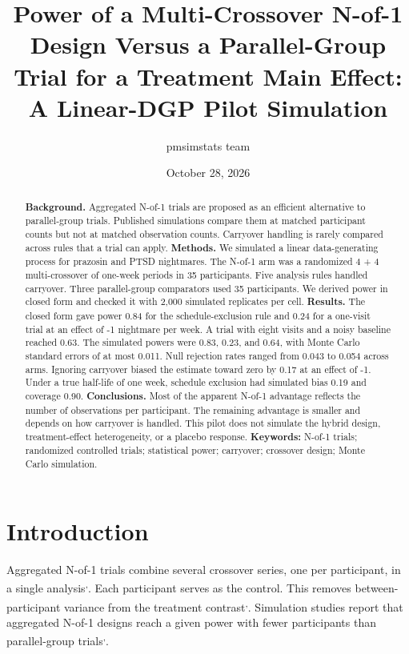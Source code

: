 \documentclass[
  11pt,
]{article}
\title{Power of a Multi-Crossover N-of-1 Design Versus a Parallel-Group Trial for a Treatment Main Effect: A Linear-DGP Pilot Simulation}
\author{pmsimstats team}
\date{October 28, 2026}
\begin{document}
\maketitle
\begin{abstract}
\textbf{Background.} Aggregated N-of-1 trials are proposed as an efficient alternative to parallel-group trials. Published simulations compare them at matched participant counts but not at matched observation counts. Carryover handling is rarely compared across rules that a trial can apply.
\textbf{Methods.} We simulated a linear data-generating process for prazosin and PTSD nightmares. The N-of-1 arm was a randomized 4 + 4 multi-crossover of one-week periods in 35 participants. Five analysis rules handled carryover. Three parallel-group comparators used 35 participants. We derived power in closed form and checked it with 2,000 simulated replicates per cell.
\textbf{Results.} The closed form gave power 0.84 for the schedule-exclusion rule and 0.24 for a one-visit trial at an effect of -1 nightmare per week. A trial with eight visits and a noisy baseline reached 0.63. The simulated powers were 0.83, 0.23, and 0.64, with Monte Carlo standard errors of at most 0.011. Null rejection rates ranged from 0.043 to 0.054 across arms. Ignoring carryover biased the estimate toward zero by 0.17 at an effect of -1. Under a true half-life of one week, schedule exclusion had simulated bias 0.19 and coverage 0.90.
\textbf{Conclusions.} Most of the apparent N-of-1 advantage reflects the number of observations per participant. The remaining advantage is smaller and depends on how carryover is handled. This pilot does not simulate the hybrid design, treatment-effect heterogeneity, or a placebo response.
\textbf{Keywords:} N-of-1 trials; randomized controlled trials; statistical power; carryover; crossover design; Monte Carlo simulation.
\end{abstract}

{
\setcounter{tocdepth}{2}
\tableofcontents
}
\section{Introduction}\label{introduction}

Aggregated N-of-1 trials combine several crossover series, one per participant, in a single analysis\textsuperscript{,}. Each participant serves as the control. This removes between-participant variance from the treatment contrast\textsuperscript{,}. Simulation studies report that aggregated N-of-1 designs reach a given power with fewer participants than parallel-group trials\textsuperscript{,}.
\end{document}
